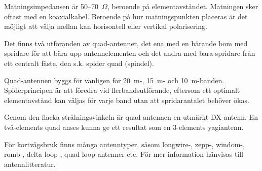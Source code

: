Matningsimpedansen är 50--70~\(\Omega\), beroende på elementavståndet.
Matningen sker oftast med en koaxialkabel.
Beroende på hur matningspunkten placeras är det möjligt att välja mellan kan
horisontell eller vertikal polarisering.

Det finns två utföranden av quad-antenner, det ena med en bärande bom
med spridare för att bära upp antennelementen och det andra med bara
spridare från ett centralt fäste, den s.k. spider quad (spindel).

Quad-antennen byggs för vanligen för 20~m-, 15~m- och 10~m-banden.
Spiderprincipen är att föredra vid flerbandsutförande, eftersom ett
optimalt elementavstånd kan väljas för varje band utan att spridarantalet
behöver ökas.

Genom den flacka strålningsvinkeln är quad-antennen en utmärkt DX-antenn.
En två-elements quad anses kunna ge ett resultat som en 3-elements yagiantenn.

För kortvågsbruk finns många antenntyper, såsom longwire-, zepp-,
windom-, romb-, delta loop-, quad loop-antenner etc. För mer
information hänvisas till antennlitteratur.
